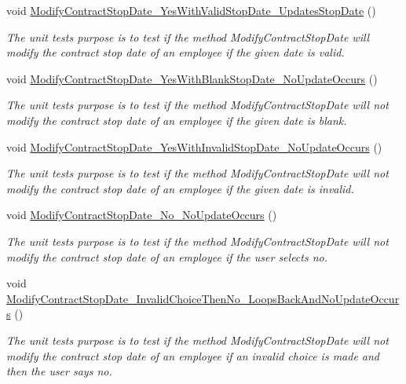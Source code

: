 \begin{DoxyCompactItemize}
void \hyperlink{class_the_company_1_1_tests_1_1_modify_employee_tests_a5e73eb34c3dea62c85a7255fa2d79bc3}{Modify\+Contract\+Stop\+Date\+\_\+\+Yes\+With\+Valid\+Stop\+Date\+\_\+\+Updates\+Stop\+Date} ()
\begin{DoxyCompactList}\small\item\em The unit test\textquotesingle{}s purpose is to test if the method Modify\+Contract\+Stop\+Date will modify the contract stop date of an employee if the given date is valid. \end{DoxyCompactList}\item 
void \hyperlink{class_the_company_1_1_tests_1_1_modify_employee_tests_a157b4dccead9de9d1ec4574a31508341}{Modify\+Contract\+Stop\+Date\+\_\+\+Yes\+With\+Blank\+Stop\+Date\+\_\+\+No\+Update\+Occurs} ()
\begin{DoxyCompactList}\small\item\em The unit test\textquotesingle{}s purpose is to test if the method Modify\+Contract\+Stop\+Date will not modify the contract stop date of an employee if the given date is blank. \end{DoxyCompactList}\item 
void \hyperlink{class_the_company_1_1_tests_1_1_modify_employee_tests_a557d957931d397922a5d20b0140ca1d4}{Modify\+Contract\+Stop\+Date\+\_\+\+Yes\+With\+Invalid\+Stop\+Date\+\_\+\+No\+Update\+Occurs} ()
\begin{DoxyCompactList}\small\item\em The unit test\textquotesingle{}s purpose is to test if the method Modify\+Contract\+Stop\+Date will not modify the contract stop date of an employee if the given date is invalid. \end{DoxyCompactList}\item 
void \hyperlink{class_the_company_1_1_tests_1_1_modify_employee_tests_a10277548920f70a8badb9a14c1775e51}{Modify\+Contract\+Stop\+Date\+\_\+\+No\+\_\+\+No\+Update\+Occurs} ()
\begin{DoxyCompactList}\small\item\em The unit test\textquotesingle{}s purpose is to test if the method Modify\+Contract\+Stop\+Date will not modify the contract stop date of an employee if the user selects no. \end{DoxyCompactList}\item 
void \hyperlink{class_the_company_1_1_tests_1_1_modify_employee_tests_a708ec434b83b086333e0df0ba8ad42cd}{Modify\+Contract\+Stop\+Date\+\_\+\+Invalid\+Choice\+Then\+No\+\_\+\+Loops\+Back\+And\+No\+Update\+Occurs} ()
\begin{DoxyCompactList}\small\item\em The unit test\textquotesingle{}s purpose is to test if the method Modify\+Contract\+Stop\+Date will not modify the contract stop date of an employee if an invalid choice is made and then the user says no. \end{DoxyCompactList}\item 

\end{DoxyCompactItemize}
